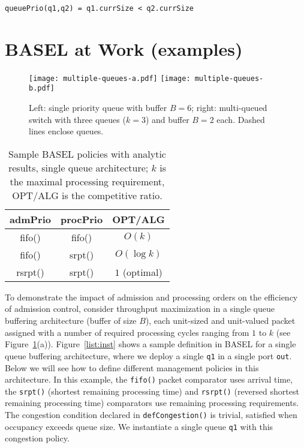 \documentclass{article}
\newcommand{\barch}{BASEL}
\begin{document}
\begin{lstlisting}[basicstyle=\ttfamily\footnotesize]
queuePrio(q1,q2) = q1.currSize < q2.currSize
\end{lstlisting}


\section{\barch{} at Work (examples)}\label{sec:examples}



\begin{figure}
\centerline{
\texttt{[image: multiple-queues-a.pdf]}
\texttt{[image: multiple-queues-b.pdf]}
}
\vspace{-10pt}
\caption{Left: single priority queue with buffer $B = 6$; right: multi-queued switch with three queues ($k = 3$) and buffer $B = 2$ each. Dashed lines enclose queues.}
\label{fig:model}
\end{figure}

\newcommand{\ttfam}[1]{{\ttfamily\footnotesize #1}}

\begin{table} \centering
\small
\vspace{2mm}
	\lstset{basicstyle=\ttfamily\footnotesize}
\begin{tabular}{ccc}\hline
\ttfam{admPrio}  & \ttfam{procPrio} & OPT/ALG \\\hline
\ttfam{fifo()} & \ttfam{fifo()}  & $O(k)$ \\
\ttfam{fifo()} & \ttfam{srpt()}  & $O(\log{k})$ \\
\ttfam{rsrpt()} & \ttfam{srpt()} & $1$ (optimal) \\\hline
\end{tabular}
\vspace{2pt}
\caption{
  Sample \barch{} policies with analytic results, single queue architecture;
  $k$ is the maximal processing requirement, OPT/ALG
  is the competitive ratio.
}\label{tbl:single-queue}
\end{table}




To demonstrate the impact of admission and processing orders on the efficiency of admission control, consider throughput maximization in a single queue buffering architecture (buffer of size $B$), each unit-sized and unit-valued packet assigned with a number of required processing cycles ranging from $1$ to $k$ (see Figure~\ref{fig:model}(a)).
Figure~\ref{list:inst} shows a sample definition in \barch{} for a single queue buffering architecture, where we
deploy a single \lstinline|q1| in a single port \lstinline|out|. Below we will see how to define different
management policies in this architecture. In this example, the \lstinline|fifo()| packet comparator uses
arrival time, the \lstinline|srpt()| (shortest remaining processing time) and \lstinline|rsrpt()| (reversed shortest remaining processing time) comparators use remaining processing requirements. The congestion condition
declared in \lstinline|defCongestion()| is trivial, satisfied when
occupancy exceeds queue size. We instantiate a single queue \lstinline|q1| 
with this congestion policy. 
\end{document}
